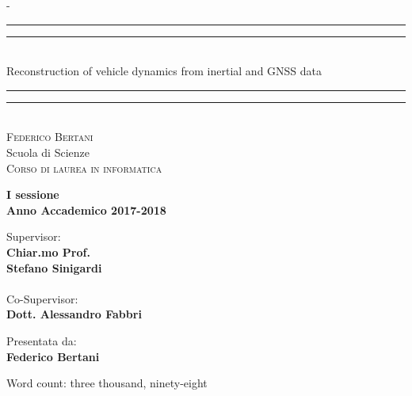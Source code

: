 \begin{titlingpage}
\begin{SingleSpace}
\calccentering{\unitlength} 
\begin{adjustwidth*}{\unitlength}{-\unitlength}
\vspace*{13mm}
\begin{center}
\rule[0.5ex]{\linewidth}{2pt}\vspace*{-\baselineskip}\vspace*{3.2pt}
\rule[0.5ex]{\linewidth}{1pt}\\[\baselineskip]
{\HUGE Reconstruction of vehicle dynamics from inertial and GNSS data }\\[4mm]
\rule[0.5ex]{\linewidth}{1pt}\vspace*{-\baselineskip}\vspace{3.2pt}
\rule[0.5ex]{\linewidth}{2pt}\\
\vspace{13mm}
{\large\textsc{Federico Bertani}}\\
\vspace{11mm}
{\large Scuola di Scienze\\
\textsc{Corso di laurea in informatica}}\\
\vspace{10mm}
\begin{center}
{\large{\bf I sessione\\
Anno Accademico 2017-2018 }}
\end{center}
\vfill
\noindent
\begin{minipage}[t]{0.47\textwidth}
{\large Supervisor:\\
\textbf{Chiar.mo Prof.\\
Stefano Sinigardi}\\
\\
Co-Supervisor:\\
\textbf{Dott. Alessandro Fabbri}}
\end{minipage}
\hfill
\begin{minipage}[t]{0.47\textwidth}\raggedleft
{\large Presentata da:\\
\textbf{Federico Bertani}}
\end{minipage}
\vspace{20mm}
\end{center}
\end{adjustwidth*}
\end{SingleSpace}
\vspace{11mm}
\begin{flushright}
{\small Word count: three thousand, ninety-eight}
\end{flushright}
\end{titlingpage}

